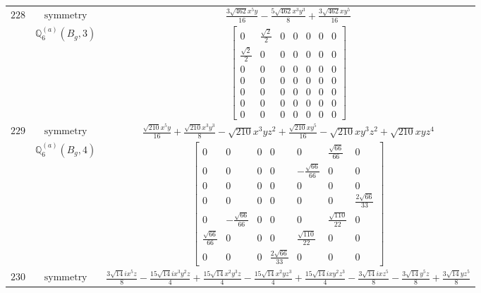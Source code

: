 \documentclass[fleqn,8pt,landscape]{jsarticle}
\begin{document}
\begin{longtable}{ccc}
$ 228 $ & $ \text{symmetry} $ & $ \frac{3 \sqrt{462} x^{5} y}{16} - \frac{5 \sqrt{462} x^{3} y^{3}}{8} + \frac{3 \sqrt{462} x y^{5}}{16} $ \\
$  $ & $ \mathbb{Q}_{6}^{(a)}(B_{g},3) $ & $ \begin{bmatrix} 0 & \frac{\sqrt{2}}{2} & 0 & 0 & 0 & 0 & 0 \\ \frac{\sqrt{2}}{2} & 0 & 0 & 0 & 0 & 0 & 0 \\ 0 & 0 & 0 & 0 & 0 & 0 & 0 \\ 0 & 0 & 0 & 0 & 0 & 0 & 0 \\ 0 & 0 & 0 & 0 & 0 & 0 & 0 \\ 0 & 0 & 0 & 0 & 0 & 0 & 0 \\ 0 & 0 & 0 & 0 & 0 & 0 & 0 \end{bmatrix} $ \\ \hline
$ 229 $ & $ \text{symmetry} $ & $ \frac{\sqrt{210} x^{5} y}{16} + \frac{\sqrt{210} x^{3} y^{3}}{8} - \sqrt{210} x^{3} y z^{2} + \frac{\sqrt{210} x y^{5}}{16} - \sqrt{210} x y^{3} z^{2} + \sqrt{210} x y z^{4} $ \\
$  $ & $ \mathbb{Q}_{6}^{(a)}(B_{g},4) $ & $ \begin{bmatrix} 0 & 0 & 0 & 0 & 0 & \frac{\sqrt{66}}{66} & 0 \\ 0 & 0 & 0 & 0 & - \frac{\sqrt{66}}{66} & 0 & 0 \\ 0 & 0 & 0 & 0 & 0 & 0 & 0 \\ 0 & 0 & 0 & 0 & 0 & 0 & \frac{2 \sqrt{66}}{33} \\ 0 & - \frac{\sqrt{66}}{66} & 0 & 0 & 0 & \frac{\sqrt{110}}{22} & 0 \\ \frac{\sqrt{66}}{66} & 0 & 0 & 0 & \frac{\sqrt{110}}{22} & 0 & 0 \\ 0 & 0 & 0 & \frac{2 \sqrt{66}}{33} & 0 & 0 & 0 \end{bmatrix} $ \\ \hline
$ 230 $ & $ \text{symmetry} $ & $ \frac{3 \sqrt{14} i x^{5} z}{8} - \frac{15 \sqrt{14} i x^{3} y^{2} z}{4} + \frac{15 \sqrt{14} x^{2} y^{3} z}{4} - \frac{15 \sqrt{14} x^{2} y z^{3}}{4} + \frac{15 \sqrt{14} i x y^{2} z^{3}}{4} - \frac{3 \sqrt{14} i x z^{5}}{8} - \frac{3 \sqrt{14} y^{5} z}{8} + \frac{3 \sqrt{14} y z^{5}}{8} $ \\

\end{longtable}
\end{document}

